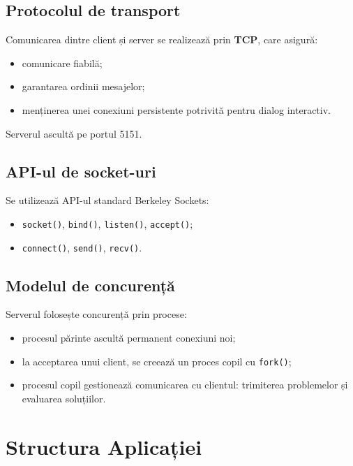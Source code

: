 \documentclass[runningheads]{llncs}
\begin{document}
\vspace{5mm}

\subsection{Protocolul de transport}
Comunicarea dintre client și server se realizează prin \textbf{TCP}, care asigură:
\begin{itemize}[noitemsep, topsep=0pt]
    \item comunicare fiabilă;
    \item garantarea ordinii mesajelor;
    \item menținerea unei conexiuni persistente potrivită pentru dialog interactiv.
\end{itemize}

Serverul ascultă pe portul 5151.

\vspace{5mm}

\subsection{API-ul de socket-uri}
Se utilizează API-ul standard Berkeley Sockets:
\begin{itemize}[noitemsep, topsep=0pt]
    \item \texttt{socket()}, \texttt{bind()}, \texttt{listen()}, \texttt{accept()};
    \item \texttt{connect()}, \texttt{send()}, \texttt{recv()}.
\end{itemize}

\subsection{Modelul de concurență}
Serverul folosește concurență prin procese:
\begin{itemize}[noitemsep, topsep=0pt]
    \item procesul părinte ascultă permanent conexiuni noi;
    \item la acceptarea unui client, se creează un proces copil cu \texttt{fork()};
    \item procesul copil gestionează comunicarea cu clientul: trimiterea problemelor și evaluarea soluțiilor.
\end{itemize}

\vspace{10mm}

\section{Structura Aplicației}
\end{document}
